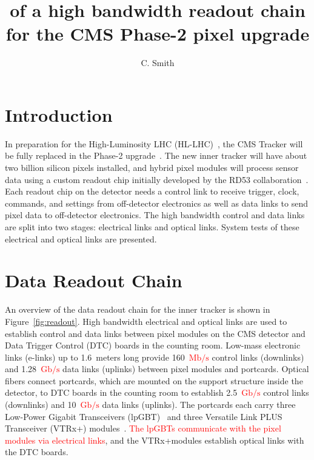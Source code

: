 \documentclass[a4paper,11pt]{article}
\title{\red{Characterization} of a high bandwidth readout chain for the CMS Phase-2 pixel upgrade}
\author{C. Smith}
\affiliation{The University of Kansas,\\Lawrence, Kansas 66045, USA}
\newcommand{\vtrxp}{VTRx+}
\newcommand{\fig}{Figure}
\newcommand{\mbps}{\ensuremath{\mathrm{Mb}/\mathrm{s}}\xspace}
\newcommand{\gbps}{\ensuremath{\mathrm{Gb}/\mathrm{s}}\xspace}
\newcommand{\red}{\textcolor{red}}
\begin{document}
\maketitle

\flushbottom


\section{Introduction}
\label{sec:introduction}

In preparation for the High-Luminosity LHC (HL-LHC)~\cite{ref:hllhc}, the CMS Tracker will be fully replaced in the Phase-2 upgrade~\cite{ref:cms,ref:tdr,ref:orfanelli}.
The new inner tracker will have about two billion silicon pixels installed,
and hybrid pixel modules will process sensor data using a custom readout chip initially developed by the RD53 collaboration~\cite{ref:rd53}.
Each readout chip on the detector needs a control link to receive trigger, clock, commands, and settings from off-detector electronics as well as data links to send pixel data to off-detector electronics.
The high bandwidth control and data links are split into two stages: electrical links and optical links.
System tests of these electrical and optical links are presented.

\section{Data Readout Chain}
\label{sec:readout}

An overview of the data readout chain for the inner tracker is shown in \fig~\ref{fig:readout}.
High bandwidth electrical and optical links are used to establish control and data links between pixel modules on the CMS detector and Data Trigger Control (DTC) boards in the counting room.
Low-mass electronic links (e-links) up to 1.6~meters long provide 160~\red{\mbps} control links (downlinks) and 1.28~\red{\gbps} data links (uplinks) between pixel modules and portcards.
Optical fibers connect portcards, which are mounted on the support structure inside the detector, to DTC boards in the counting room to establish 2.5~\red{\gbps} control links (downlinks) and 10~\red{\gbps} data links (uplinks).
The portcards each carry three Low-Power Gigabit Transceivers (lpGBT)~\cite{ref:lpgbt_1} and three Versatile Link PLUS Transceiver (\vtrxp) modules~\cite{ref:vtrxp}.
\red{The lpGBTs communicate with the pixel modules via electrical links}, and the \vtrxp\space modules establish optical links with the DTC boards.
\end{document}

